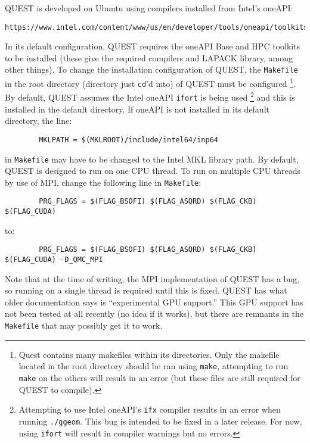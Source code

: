 \documentclass[12pt]{article}
\begin{document}
        QUEST is developed on Ubuntu using compilers installed from Intel's oneAPI:
        \begin{verbatim}
https://www.intel.com/content/www/us/en/developer/tools/oneapi/toolkits.html#gs.3kfmxb
        \end{verbatim}
        In its default configuration, QUEST requires the oneAPI Base and HPC toolkits to be installed (these give the required compilers and LAPACK library, among other things).
        To change the installation configuration of QUEST, the \texttt{Makefile} in the root directory (directory just \texttt{cd}'d into) of QUEST must be configured \footnote{Quest contains many makefiles within its directories. Only the makefile located in the root directory should be ran using \texttt{make}, attempting to run \texttt{make} on the others will result in an error (but these files are still required for QUEST to compile).}.
        By default, QUEST assumes the Intel oneAPI \texttt{ifort} is being used \footnote{Attempting to use Intel oneAPI's \texttt{ifx} compiler results in an error when running \texttt{./ggeom}. This bug is intended to be fixed in a later release. For now, using \texttt{ifort} will result in compiler warnings but no errors.} and this is installed in the default directory.
        If oneAPI is not installed in its default directory, the line:
        \begin{verbatim}
        MKLPATH = $(MKLROOT)/include/intel64/inp64
        \end{verbatim}
        in \texttt{Makefile} may have to be changed to the Intel MKL library path.
        By default, QUEST is designed to run on one CPU thread.
        To run on multiple CPU threads by use of MPI, change the following line in \texttt{Makefile}:
        \begin{verbatim}
        PRG_FLAGS = $(FLAG_BSOFI) $(FLAG_ASQRD) $(FLAG_CKB) $(FLAG_CUDA)
        \end{verbatim} 
        to:
        \begin{verbatim}
        PRG_FLAGS = $(FLAG_BSOFI) $(FLAG_ASQRD) $(FLAG_CKB) $(FLAG_CUDA) -D_QMC_MPI
        \end{verbatim}        
        Note that at the time of writing, the MPI implementation of QUEST has a bug, so running on a single thread is required until this is fixed.
        QUEST has what older documentation says is ``experimental GPU support.''
        This GPU support has not been tested at all recently (no idea if it works), but there are remnants in the \texttt{Makefile} that may possibly get it to work. \\
\end{document}
